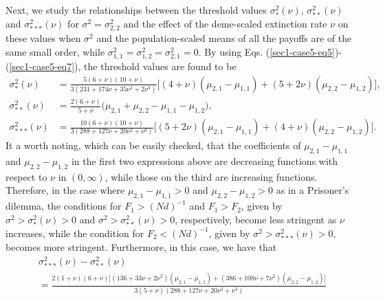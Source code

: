 \documentclass[11pt]{article}
\begin{document}
Next, we study the relationships between the threshold values $\sigma^2_{*}(\nu)$, $\sigma^2_{**}(\nu)$ and $\sigma^2_{***}(\nu)$ for $\sigma^2=\sigma^2_{2,2}$ and the effect of the deme-scaled extinction rate $\nu$ on these values when $\sigma^2$ and the population-scaled means of all the payoffs are of the same small order, while $\sigma^2_{1,1}=\sigma^2_{1,2}=\sigma^2_{2,1}=0$.
By using Eqs. (\ref{sec1-case5-eq5})-(\ref{sec1-case5-eq7}), the threshold values are found to be
\begin{subequations}\label{sec5-case1-eq7}
\begin{align}
\sigma^2_{*}(\nu)&=\frac{5(6+\nu)(10+\nu)}{3(231+174\nu+35\nu^2+2\nu^3)}\Big[(4+\nu)(\mu_{2,1}-\mu_{1,1})+(5+2\nu)
(\mu_{2,2}-\mu_{1,2})\Big],\\
\sigma^2_{**}(\nu)&=\frac{2(6+\nu)}{5+\nu}\Big(\mu_{2,1}+\mu_{2,2}-\mu_{1,1}-\mu_{1,2}\Big),\\
\sigma^2_{***}(\nu)&=\frac{10(6+\nu)(10+\nu)}{3(288+127\nu+20\nu^2+\nu^3)}\Big[(5+2\nu)(\mu_{2,1}-\mu_{1,1})+(4+\nu)
(\mu_{2,2}-\mu_{1,2})\Big].
\end{align}
\end{subequations}
It a worth noting, which can be easily checked, that the coefficients of $\mu_{2,1}-\mu_{1,1}$ and $\mu_{2,2}-\mu_{1,2}$ in the first two expressions above %
are decreasing functions with respect to $\nu$ in $(0,\infty)$, while those on the third %
are increasing functions. %
Therefore, in the case where $\mu_{2,1}-\mu_{1,1}>0$ and $\mu_{2,2}-\mu_{1,2}>0$ as in a Prisoner's dilemma, the conditions for $F_1>(Nd)^{-1}$ and $F_1 > F_2$, given by $\sigma^2> \sigma^2_{*}(\nu)>0$ and $\sigma^2> \sigma^2_{**}(\nu)>0$, respectively, become less stringent as $\nu$ increases, while the condition for $F_2<(Nd)^{-1}$,  given by $\sigma^2> \sigma^2_{***}(\nu)>0$, becomes more stringent. 
Furthermore, in this case, we have that
\begin{align}
&\sigma^2_{***}(\nu)-\sigma^2_{**}(\nu)\nonumber\\
&=\frac{2(1+\nu)(6+\nu)\Big[(136+33\nu+2\nu^2)(\mu_{2,1}-\mu_{1,1})  + (386+108\nu+7\nu^2)(\mu_{2,2}-\mu_{1,2})\Big]}{3(5+\nu)(288+127\nu+20\nu^2+\nu^3)}
\end{align}
\end{document}
